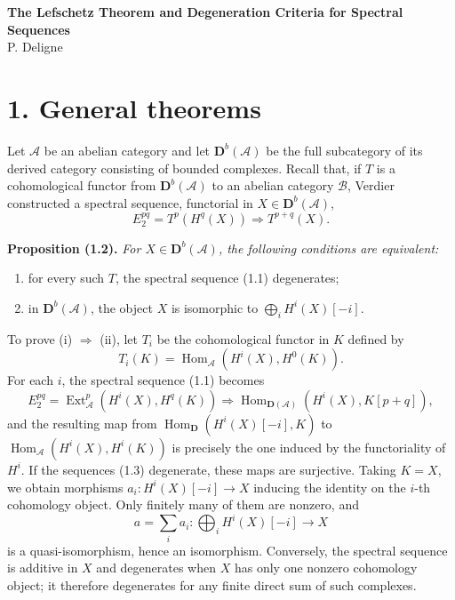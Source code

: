 \documentclass[11pt]{article}
\DeclareMathOperator{\Hom}{Hom}
\DeclareMathOperator{\Ext}{Ext}
\newcommand{\bD}{\mathbf D}
\newcommand{\cA}{\mathcal A}
\newcommand{\cB}{\mathcal B}
\newenvironment{named}[1]{\par\medskip\noindent\textbf{#1}\itshape}{\par\medskip}
\begin{document}
\begin{center}
{\Large\bfseries The Lefschetz Theorem and Degeneration Criteria for Spectral Sequences}\\[0.7em]
{\large P. Deligne}
\end{center}

\section*{1. General theorems}
Let $\cA$ be an abelian category and let $\bD^b(\cA)$ be the full subcategory of its derived category consisting of bounded complexes. Recall that, if $T$ is a cohomological functor from $\bD^b(\cA)$ to an abelian category $\cB$, Verdier constructed a spectral sequence, functorial in $X\in\bD^b(\cA)$,
\begin{equation}\tag{1.1}
E_2^{pq}=T^p(H^q(X))\Longrightarrow T^{p+q}(X).
\end{equation}

\begin{named}{Proposition (1.2).}
For $X\in\bD^b(\cA)$, the following conditions are equivalent:
\begin{enumerate}[label=(\roman*)]
\item for every such $T$, the spectral sequence (1.1) degenerates;
\item in $\bD^b(\cA)$, the object $X$ is isomorphic to $\bigoplus_iH^i(X)[-i]$.
\end{enumerate}
\end{named}
To prove (i) $\Rightarrow$ (ii), let $T_i$ be the cohomological functor in $K$ defined by
\[
T_i(K)=\Hom_\cA(H^i(X),H^0(K)).
\]
For each $i$, the spectral sequence (1.1) becomes
\begin{equation}\tag{1.3}
E_2^{pq}=\Ext_\cA^p(H^i(X),H^q(K))\Longrightarrow \Hom_{\bD(\cA)}(H^i(X),K[p+q]),
\end{equation}
and the resulting map from $\Hom_{\bD}(H^i(X)[-i],K)$ to $\Hom_\cA(H^i(X),H^i(K))$ is precisely the one induced by the functoriality of $H^i$. If the sequences (1.3) degenerate, these maps are surjective. Taking $K=X$, we obtain morphisms $a_i:H^i(X)[-i]\to X$ inducing the identity on the $i$-th cohomology object. Only finitely many of them are nonzero, and
\[
a=\sum_i a_i:\bigoplus_iH^i(X)[-i]\longrightarrow X
\]
is a quasi-isomorphism, hence an isomorphism. Conversely, the spectral sequence is additive in $X$ and degenerates when $X$ has only one nonzero cohomology object; it therefore degenerates for any finite direct sum of such complexes.
\end{document}
